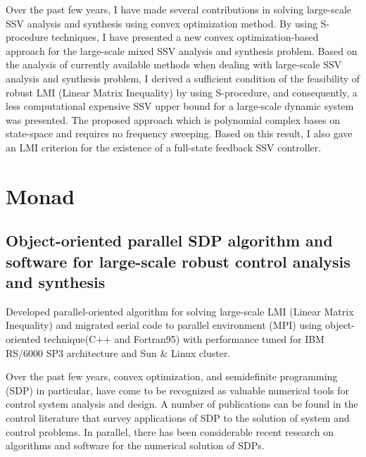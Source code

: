 \documentclass{article}
\begin{document}
Over the past few years, I have made several contributions in solving large-scale SSV analysis and synthesis
using convex optimization method.
By using S-procedure techniques, I have presented a new convex optimization-based
approach for the large-scale mixed SSV analysis and synthesis problem.
Based on the analysis of currently available methods when dealing with large-scale SSV analysis and synthesis problem,
I derived a sufficient condition of the feasibility of robust LMI (Linear Matrix Inequality)
by using S-procedure, and consequently, a less computational expensive SSV upper bound for
a large-scale dynamic system was presented.
The proposed approach {\citep{FYH03}} which is polynomial complex bases on state-space and requires no frequency sweeping.
Based on this result, I also gave an LMI criterion for the existence of a full-state feedback SSV controller.

\section{Monad}
\subsection{Object-oriented parallel SDP algorithm and software for large-scale robust control analysis and synthesis}
Developed parallel-oriented algorithm for solving large-scale LMI (Linear Matrix Inequality)
and migrated serial code to parallel environment (MPI) using object-oriented technique(C++ and Fortran95)
with performance tuned for IBM RS/6000 SP3 architecture and Sun \& Linux cluster.

Over the past few years, convex optimization, and semidefinite programming (SDP) in particular, have
come to be recognized as valuable numerical tools for control system analysis and design.
A number of publications can be found in the control literature that survey applications of
SDP to the solution of system and control problems. In parallel, there has been considerable
recent research on algorithms and software for the numerical solution of SDPs.



\end{document}
